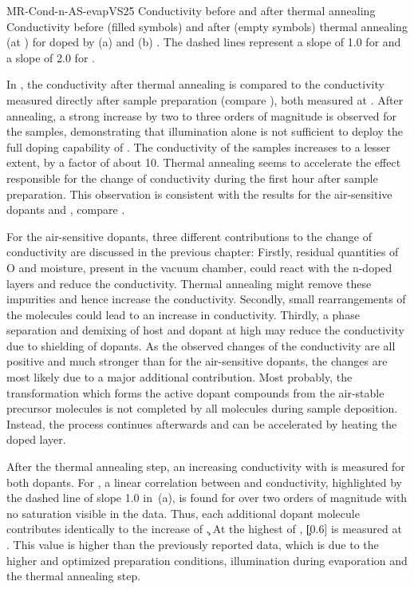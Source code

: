 \cBild
{MR-Cond-n-AS-evapVS25}
{Conductivity before and after thermal annealing}
{Conductivity before (filled symbols) and after (empty symbols) thermal annealing (at \T[100]) for \CS doped by (a) \aob and (b) \dmbi. The dashed lines represent a slope of 1.0 for \aob and a slope of 2.0 for \dmbi.
}

In , the conductivity after thermal annealing is compared to the conductivity measured directly after sample preparation (compare ), both measured at \T[25]. After annealing, a strong increase by two to three orders of magnitude is observed for the \aob samples, demonstrating that illumination alone is not sufficient to deploy the full doping capability of \aob. The conductivity of the \dmbi samples increases to a lesser extent, by a factor of about 10.
Thermal annealing seems to accelerate the effect responsible for the change of conductivity during the first hour after sample preparation. This observation is consistent with the results for the air-sensitive dopants \CrPd and \WPd, compare .

For the air-sensitive dopants, three different contributions to the change of conductivity are discussed in the previous chapter: Firstly, residual quantities of O and moisture, present in the vacuum chamber, could react with the n-doped layers and reduce the conductivity. Thermal annealing might remove these impurities and hence increase the conductivity. Secondly, small rearrangements of the molecules could lead to an increase in conductivity. Thirdly, a phase separation and demixing of host and dopant at high \CLong may reduce the conductivity due to shielding of dopants.
As the observed changes of the conductivity are all positive and much stronger than for the air-sensitive dopants, the changes are most likely due to a major additional contribution. Most probably, the transformation which forms the active dopant compounds from the air-stable precursor molecules is not completed by all molecules during sample deposition. Instead, the process continues afterwards and can be accelerated by heating the doped layer.

After the thermal annealing step, an increasing conductivity with \CLong is measured for both dopants.
For \aob, a linear correlation between \CLong and conductivity, highlighted by the dashed line of slope 1.0 in \,(a), is found for over two orders of magnitude with no saturation visible in the data. Thus, each additional dopant molecule contributes identically to the increase of \c.
At the highest \C[0.510] of \aob, \c[0.6] is measured at \T[25]. This value is higher than the previously reported data\cite{Li2006}, which is due to the higher \CLong and optimized preparation conditions, \eg illumination during evaporation and the thermal annealing step.

